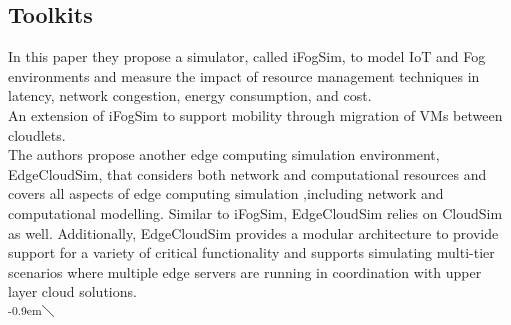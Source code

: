 \subsection{Toolkits}
\label{sec:Toolkits}

\cite{gupta2017ifogsim}
In this paper they propose a simulator, called iFogSim, to model IoT and Fog environments and measure the impact of resource management techniques in latency, network congestion, energy consumption, and cost.\\

\cite{Lopes2017}
An extension of iFogSim to support mobility through migration of VMs between cloudlets.\\

\cite{sonmez2017edgecloudsim}
The authors propose another edge computing simulation environment, EdgeCloudSim, that considers both network and computational resources and covers all aspects of edge computing simulation ,including network and computational modelling. Similar to iFogSim, EdgeCloudSim relies on CloudSim as well. Additionally, EdgeCloudSim provides a modular architecture to provide support for a variety of critical functionality and supports simulating multi-tier scenarios where multiple edge servers are running in coordination with upper layer cloud solutions.\\

\Checkmark\textsuperscript{\kern-0.9em$\diagdown$}\\

\halfcorrect


